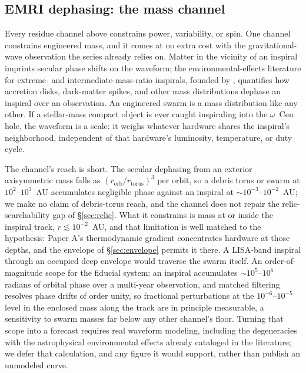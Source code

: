 \documentclass[11pt]{article}
\newcommand{\ocen}{\ensuremath{\omega}~Cen}
\begin{document}
\subsection{EMRI dephasing: the mass channel}
\label{sec:dephasing}

Every residue channel above constrains power, variability, or spin. One channel constrains engineered mass, and it comes at no extra cost with the gravitational-wave observation the series already relies on. Matter in the vicinity of an inspiral imprints secular phase shifts on the waveform; the environmental-effects literature for extreme- and intermediate-mass-ratio inspirals, founded by \citet{BarausseCardosoPani2014}, quantifies how accretion disks, dark-matter spikes, and other mass distributions dephase an inspiral over an observation. An engineered swarm is a mass distribution like any other. If a stellar-mass compact object is ever caught inspiraling into the \ocen{} hole, the waveform is a scale: it weighs whatever hardware shares the inspiral's neighborhood, independent of that hardware's luminosity, temperature, or duty cycle.

The channel's reach is short. The secular dephasing from an exterior axisymmetric mass falls as $(r_{\mathrm{orb}}/r_{\mathrm{torus}})^{3}$ per orbit, so a debris torus or swarm at $10^{2}$--$10^{3}$~AU accumulates negligible phase against an inspiral at $\sim 10^{-3}$--$10^{-2}$~AU; we make no claim of debris-torus reach, and the channel does not repair the relic-searchability gap of \S\ref{sec:relic}. What it constrains is mass at or inside the inspiral track, $r \lesssim 10^{-2}$~AU, and that limitation is well matched to the hypothesis: Paper A's thermodynamic gradient concentrates hardware at those depths, and the envelope of \S\ref{sec:envelope} permits it there. A LISA-band inspiral through an occupied deep envelope would traverse the swarm itself.
An order-of-magnitude scope for the fiducial system: an inspiral accumulates $\sim 10^{5}$--$10^{6}$ radians of orbital phase over a multi-year observation, and matched filtering resolves phase drifts of order unity, so fractional perturbations at the $10^{-6}$--$10^{-5}$ level in the enclosed mass along the track are in principle measurable, a sensitivity to swarm masses far below any other channel's floor. Turning that scope into a forecast requires real waveform modeling, including the degeneracies with the astrophysical environmental effects already cataloged in the literature; we defer that calculation, and any figure it would support, rather than publish an unmodeled curve.
\end{document}
